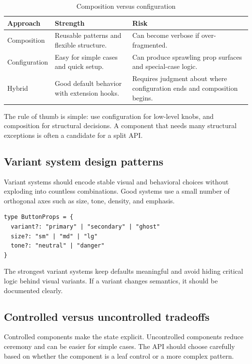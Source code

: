 \begin{table}[htbp]
  \centering
  \caption{Composition versus configuration}
  \begin{tabularx}{\textwidth}{@{}p{}p{}Y@{}}
    \toprule
    \textbf{Approach} & \textbf{Strength} & \textbf{Risk} \\
    \midrule
    Composition & Reusable patterns and flexible structure. & Can become verbose if over-fragmented. \\
    Configuration & Easy for simple cases and quick setup. & Can produce sprawling prop surfaces and special-case logic. \\
    Hybrid & Good default behavior with extension hooks. & Requires judgment about where configuration ends and composition begins. \\
    \bottomrule
  \end{tabularx}
\end{table}

The rule of thumb is simple: use configuration for low-level knobs, and composition for structural decisions. A component that needs many structural exceptions is often a candidate for a split API.

\subsection{Variant system design patterns}
Variant systems should encode stable visual and behavioral choices without exploding into countless combinations. Good systems use a small number of orthogonal axes such as size, tone, density, and emphasis.

\begin{verbatim}
type ButtonProps = {
  variant?: "primary" | "secondary" | "ghost"
  size?: "sm" | "md" | "lg"
  tone?: "neutral" | "danger"
}
\end{verbatim}

The strongest variant systems keep defaults meaningful and avoid hiding critical logic behind visual variants. If a variant changes semantics, it should be documented clearly.

\subsection{Controlled versus uncontrolled tradeoffs}
Controlled components make the state explicit. Uncontrolled components reduce ceremony and can be easier for simple cases. The API should choose carefully based on whether the component is a leaf control or a more complex pattern.

